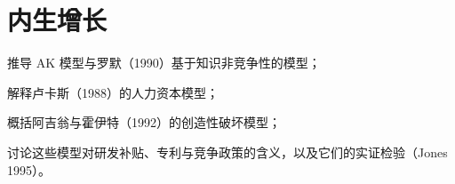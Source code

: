 \chapter{内生增长}\label{ch:endogenous}

\begin{chapterguide}
\begin{guidegoals}
\item 推导 AK 模型与罗默（1990）基于知识非竞争性的模型；
\item 解释卢卡斯（1988）的人力资本模型；
\item 概括阿吉翁与霍伊特（1992）的创造性破坏模型；
\item 讨论这些模型对研发补贴、专利与竞争政策的含义，以及它们的实证检验（Jones 1995）。
\end{guidegoals}
\end{chapterguide}

\chapterstub
